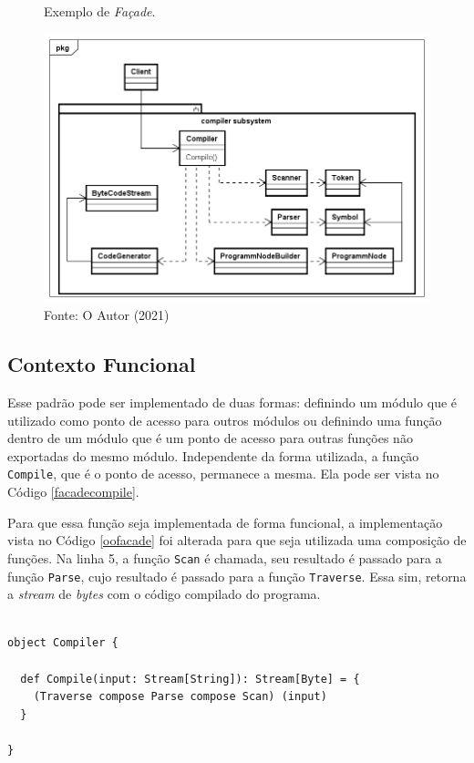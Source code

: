 \begin{figure}[htb]
	\caption{\label{facade_exemplo}Exemplo de \textit{Façade}.}
	\begin{center}
	    \includegraphics[scale=0.4]{5_padroes-contexto-funcional/5.2_estruturais/5.2.5_facade/facade_exemplo.png}
	\end{center}
  \caption*{Fonte: O Autor (2021)}
\end{figure}


\subsection*{Contexto Funcional}

Esse padrão pode ser implementado de duas formas: 
definindo um módulo que é utilizado como ponto de 
acesso para outros módulos ou definindo uma 
função dentro de um módulo que é um ponto de 
acesso para outras funções não exportadas do 
mesmo módulo. Independente da forma utilizada, 
a função \texttt{Compile}, que é o ponto de acesso, permanece 
a mesma. Ela pode ser vista no Código \ref{facadecompile}. 

Para que essa função seja implementada de forma 
funcional, a implementação vista no Código \ref{oofacade} 
foi alterada para que seja utilizada uma composição 
de funções. Na linha 5, a função \texttt{Scan} é chamada, 
seu resultado é passado para a função \texttt{Parse}, cujo 
resultado é passado para a função \texttt{Traverse}. Essa sim, 
retorna a \textit{stream} de \textit{bytes} com o 
código compilado do programa.

\begin{lstlisting}[caption={Função de acesso \texttt{Compile}.},label=facadecompile]
    
object Compiler {

  def Compile(input: Stream[String]): Stream[Byte] = {
    (Traverse compose Parse compose Scan) (input)
  }
  
}
    
\end{lstlisting}


